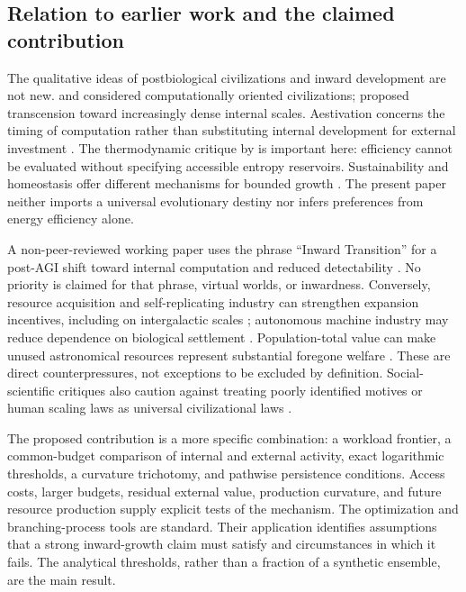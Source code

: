 \subsection{Relation to earlier work and the claimed contribution}

The qualitative ideas of postbiological civilizations and inward development are not new. \citet{Dick2003} and \citet{CirkovicBradbury2006} considered computationally oriented civilizations; \citet{Smart2012} proposed transcension toward increasingly dense internal scales. Aestivation concerns the timing of computation rather than substituting internal development for external investment \citep{Sandberg2017}. The thermodynamic critique by \citet{BennettHansonRiedel2019} is important here: efficiency cannot be evaluated without specifying accessible entropy reservoirs. Sustainability and homeostasis offer different mechanisms for bounded growth \citep{HaqqMisraBaum2009,WongBartlett2022}. The present paper neither imports a universal evolutionary destiny nor infers preferences from energy efficiency alone.

A non-peer-reviewed working paper uses the phrase ``Inward Transition'' for a post-AGI shift toward internal computation and reduced detectability \citep{Pitti2026}. No priority is claimed for that phrase, virtual worlds, or inwardness. Conversely, resource acquisition and self-replicating industry can strengthen expansion incentives, including on intergalactic scales \citep{ArmstrongSandberg2013}; autonomous machine industry may reduce dependence on biological settlement \citep{Ivliev2026}. Population-total value can make unused astronomical resources represent substantial foregone welfare \citep{Bostrom2003Waste}. These are direct counterpressures, not exceptions to be excluded by definition. Social-scientific critiques also caution against treating poorly identified motives or human scaling laws as universal civilizational laws \citep{Shkurko2024,JacksonCriadoPerez2024}.

The proposed contribution is a more specific combination: a workload frontier, a common-budget comparison of internal and external activity, exact logarithmic thresholds, a curvature trichotomy, and pathwise persistence conditions. Access costs, larger budgets, residual external value, production curvature, and future resource production supply explicit tests of the mechanism. The optimization and branching-process tools are standard. Their application identifies assumptions that a strong inward-growth claim must satisfy and circumstances in which it fails. The analytical thresholds, rather than a fraction of a synthetic ensemble, are the main result.


